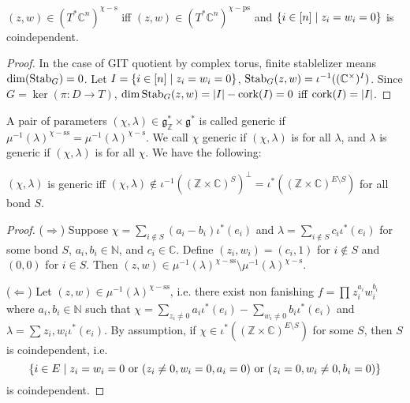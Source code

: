 \documentclass[b5paper]{article}
\newcommand{\del}{\setminus}
\newcommand{\sstab}{\mathrm{ss}}
\newcommand{\pstab}{\mathrm{ps}}
\newcommand{\stab}{\mathrm{s}}
\newcommand{\Stab}{\textnormal{Stab}}
\newcommand{\cork}{\textnormal{cork}}
\begin{document}
\begin{proposition}[pps:]{}
  $(z,w)\in (T^*\mathbb{C}^n)^{\chi-\stab}$ iff $(z,w)\in (T^*\mathbb{C}^n)^{\chi-\pstab}$ and $\left\{i\in [n]\mid z_i=w_i=0\right\}$ is coindependent.
  \begin{proof}
    In the case of GIT quotient by complex torus, finite stablelizer means $\dim(\Stab_G)=0$. Let $I=\left\{i\in [n] \mid z_i=w_i=0\right\}$, $\Stab_G(z,w)=\iota^{-1}((\mathbb{C}^\times )^I)$. Since $G=\ker(\pi:D\rightarrow T)$, $\dim\Stab_G(z,w)=|I|-\cork(I)=0$ iff $\cork(I)=|I|$.
  \end{proof}
\end{proposition}

A pair of parameters $(\chi,\lambda)\in \mathfrak{g}^*_{\mathbb{Z}}\times \mathfrak{g}^*$ is called generic if $\mu^{-1}(\lambda)^{\chi-\sstab}=\mu^{-1}(\lambda)^{\chi-\stab}$. We call $\chi$ generic if $(\chi,\lambda)$ is for all $\lambda$, and $\lambda$ is generic if $(\chi,\lambda)$ is for all $\chi$. We have the following:

\begin{proposition}[pps:]{}
  $(\chi,\lambda)$ is generic iff $(\chi,\lambda)\notin \iota^{-1}((\mathbb{Z}\times \mathbb{C})^S)^\perp=\iota^*((\mathbb{Z}\times \mathbb{C})^{E\del S})$ for all bond $S$.
  \begin{proof}
    ($\Rightarrow $) Suppose $\chi=\sum_{i\notin S}^{}(a_i-b_i)\iota^*(e_i)$ and $\lambda=\sum_{i\notin S}c_i\iota^*(e_i)$ for some bond $S$, $a_i,b_i\in \mathbb{N}$, and $c_i\in \mathbb{C}$. Define $(z_i,w_i)=(c_i,1)$ for $i\notin S$ and $(0,0)$ for $i\in S$. Then $(z,w)\in \mu^{-1}(\lambda)^{\chi-\sstab}\del\mu^{-1}(\lambda)^{\chi-\stab}$.

    ($\Leftarrow $) Let $(z,w)\in \mu^{-1}(\lambda)^{\chi-\sstab}$, i.e. there exist non fanishing $f=\prod_{}^{}z_i^{a_i}w_i^{b_i}$ where $a_i,b_i\in \mathbb{N}$ such that $\chi=\sum_{z_i\neq 0}^{}a_i\iota^*(e_i)-\sum_{w_i\neq 0}^{}b_i\iota^*(e_i)$ and $\lambda=\sum_{}^{}z_i,w_i\iota^*(e_i)$. By assumption, if $\chi\in \iota^*((\mathbb{Z}\times \mathbb{C})^{E\del S})$ for some $S$, then $S$ is coindependent, i.e. 
    \[
      \left\{i\in E\mid z_i=w_i=0\textnormal{ or }(z_i\neq 0,w_i=0,a_i=0)\textnormal{ or }(z_i=0,w_i\neq 0,b_i=0)\right\}
    \]
    is coindependent.
  \end{proof}
\end{proposition}
\end{document}
